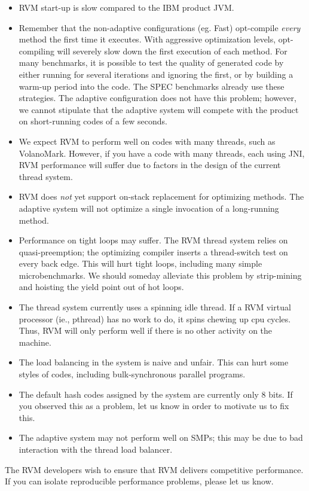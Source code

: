 \begin{itemize}
\item RVM start-up is slow compared to the IBM product JVM.
\item Remember that the non-adaptive configurations (eg. Fast) opt-compile
{\em every} method the first time it executes.  With aggressive optimization
levels, opt-compiling will severely slow down the first execution of
each method.  For many benchmarks, it is possible to test the quality
of generated code by either running for several iterations and ignoring
the first, or by building a warm-up period into the code.  The SPEC benchmarks
already use these strategies.  The adaptive configuration does not
have this problem; however, we cannot stipulate that the adaptive
system will compete with the product on short-running codes of a few seconds.
\item We expect RVM to perform well on codes with many threads, such as
VolanoMark.  However, if you have a code with many threads, each using
JNI, RVM performance will suffer due to factors in the design of
the current thread system.
\item RVM does {\em not} yet support on-stack replacement for
optimizing methods.  The adaptive system will not optimize a single
invocation of a long-running 
method.
\item Performance on tight loops may suffer.  The RVM thread system
relies on quasi-preemption; the optimizing compiler inserts a thread-switch
test on every back edge.  This will hurt tight loops, including many
simple microbenchmarks.  We should someday alleviate this problem by
strip-mining and hoisting the yield point out of hot loops.
\item The thread system currently uses a spinning idle thread. If a RVM
virtual processor (ie., pthread) has no work to do, it spins chewing up
cpu cycles.  Thus, RVM will only perform well if there is no other activity on the machine.
\item The load balancing in the system is naive and unfair.  This can hurt some styles of codes, including bulk-synchronous parallel programs.
\item The default hash codes assigned by the system are currently only 8
bits.  If you observed this as a problem, let us know in order to motivate
us to fix this.
\item The adaptive system may not perform well on SMPs; this may be due to bad
interaction with the thread load balancer.
\end{itemize}

The RVM developers wish to ensure that RVM delivers competitive performance.
If you can isolate reproducible performance problems, please let us
know. 
